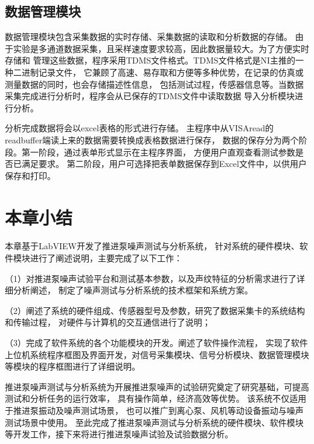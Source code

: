 \subsection{数据管理模块}
数据管理模块包含采集数据的实时存储、采集数据的读取和分析数据的存储。
由于实验是多通道数据采集，且采样速度要求较高，因此数据量较大。为了方便实时存储和
管理这些数据，程序采用TDMS文件格式。TDMS文件格式是NI主推的一种二进制记录文件，
它兼顾了高速、易存取和方便等多种优势，在记录的仿真或测量数据的同时，也会存储描述性信息，
包括测试过程，传感器信息等。当数据采集完成进行分析时，程序会从已保存的TDMS文件中读取数据
导入分析模块进行分析。

分析完成数据将会以excel表格的形式进行存储。
主程序中从VISAread的readbuffer端读上来的数据需要转换成表格数据进行保存，
数据的保存分为两个阶段。第一阶段，通过表单形式显示在主程序界面，
方便用户直观查看测试参数是否已满足要求。
第二阶段，用户可选择把表单数据保存到Excel文件中，以供用户保存和打印。
\begin{comment}
\begin{figure}[htbp]
    \centering
    \texttt{[image: 2文件存储.png]}
    \caption{\label{fig:save}数据实时存储程序框图}
\end{figure}
\begin{figure}[htbp]
    \centering
    \texttt{[image: 2文件读取.jpg]}
    \caption{\label{fig:read}数据读取程序框图}
\end{figure}
\end{comment}
\section{本章小结}
本章基于LabVIEW开发了推进泵噪声测试与分析系统，
针对系统的硬件模块、软件模块进行了阐述说明，主要完成了以下工作：

（1）对推进泵噪声试验平台和测试基本参数，以及声纹特征的分析需求进行了详细分析阐述，
制定了噪声测试与分析系统的技术框架和系统方案。

（2）阐述了系统的硬件组成、传感器型号及参数，研究了数据采集卡的系统结构和传输过程，
对硬件与计算机的交互通信进行了说明；

（3）完成了软件系统的各个功能模块的开发。阐述了软件操作流程，
实现了软件上位机系统程序框图及界面开发，对信号采集模块、信号分析模块、数据管理模块等模块的程序框图进行了详细说明。

推进泵噪声测试与分析系统为开展推进泵噪声的试验研究奠定了研究基础，可提高测试和分析任务的运行效率，
具有操作简单，经济高效等优势。
该系统不仅适用于推进泵振动及噪声测试场景，
也可以推广到离心泵、风机等动设备振动与噪声测试场景中使用。
至此完成了推进泵噪声测试与分析系统的硬件模块、软件模块等开发工作，接下来将进行推进泵噪声试验及试验数据分析。

